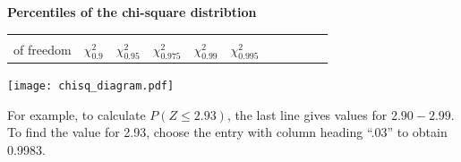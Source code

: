 \documentclass[a4paper]{article}
\begin{document}
\begin{center}
  {\Large\bf Percentiles of the chi-square distribtion}
\end{center}

\rule{0mm}{5mm}
\pagestyle{empty}
\thispagestyle{empty}
\begin{table}[ht]
\centering
\begin{tabular}{r|llllllllll}
  \begin{minipage}{20mm}degrees\\of freedom\end{minipage}
  & {\Large $\chi^2_{0.9}$}
  & {\Large $\chi^2_{0.95}$}
  & {\Large $\chi^2_{0.975}$}
  & {\Large $\chi^2_{0.99}$}
  & {\Large $\chi^2_{0.995}$}
  \rule[-4mm]{0mm}{10mm}
  \\  \hline

  \hline
\end{tabular}
\end{table}

\begin{centering}
\texttt{[image: chisq\_diagram.pdf]}
\end{centering}

\noindent For example, to calculate \(P(Z\leqslant 2.93)\), the last
line gives values for \(2.90-2.99\).  To find the value for 2.93,
choose the entry with column heading ``.03'' to obtain 0.9983.
\\
\end{document}
